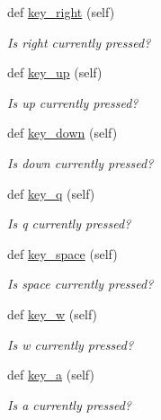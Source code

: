 \begin{DoxyCompactItemize}
def \hyperlink{classbridges_1_1non__blocking__game_1_1_non_blocking_game_a31b6f78c39a93f0ba5350d346043bde9}{key\+\_\+right} (self)
\begin{DoxyCompactList}\small\item\em Is right currently pressed? \end{DoxyCompactList}\item 
def \hyperlink{classbridges_1_1non__blocking__game_1_1_non_blocking_game_a7e853081cefe51511de0c6438aeea871}{key\+\_\+up} (self)
\begin{DoxyCompactList}\small\item\em Is up currently pressed? \end{DoxyCompactList}\item 
def \hyperlink{classbridges_1_1non__blocking__game_1_1_non_blocking_game_af9a280c2d221140eddba0e4bcb0afb9b}{key\+\_\+down} (self)
\begin{DoxyCompactList}\small\item\em Is down currently pressed? \end{DoxyCompactList}\item 
def \hyperlink{classbridges_1_1non__blocking__game_1_1_non_blocking_game_a75e94a930466b607828b6ef092f810d6}{key\+\_\+q} (self)
\begin{DoxyCompactList}\small\item\em Is q currently pressed? \end{DoxyCompactList}\item 
def \hyperlink{classbridges_1_1non__blocking__game_1_1_non_blocking_game_a1059ffd8d5daa3a0db2e6847f5724883}{key\+\_\+space} (self)
\begin{DoxyCompactList}\small\item\em Is space currently pressed? \end{DoxyCompactList}\item 
def \hyperlink{classbridges_1_1non__blocking__game_1_1_non_blocking_game_abeb435c75a3022c50f472ee2a4207809}{key\+\_\+w} (self)
\begin{DoxyCompactList}\small\item\em Is w currently pressed? \end{DoxyCompactList}\item 
def \hyperlink{classbridges_1_1non__blocking__game_1_1_non_blocking_game_a7076d0ff62aeba49a0caf71e213361db}{key\+\_\+a} (self)
\begin{DoxyCompactList}\small\item\em Is a currently pressed? \end{DoxyCompactList}\item 

\end{DoxyCompactItemize}
